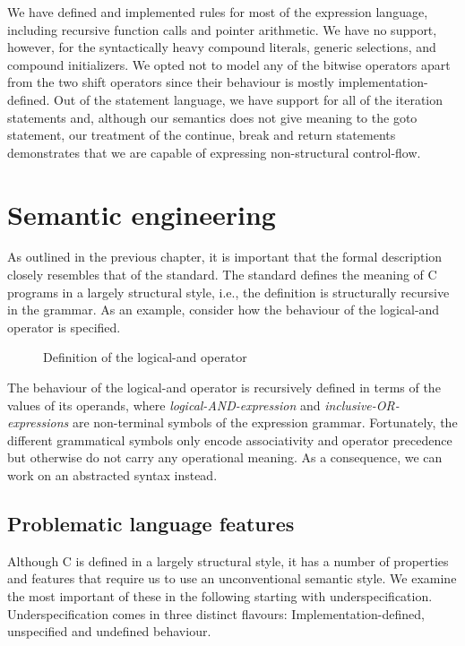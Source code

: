\documentclass[a4paper,12pt]{scrbook}
\theoremstyle{plain}
\theoremstyle{definition}
\begin{document}
We have defined and implemented rules for most of the expression language,
including recursive function calls and pointer arithmetic. We have no support,
however, for the syntactically heavy compound literals, generic selections, and
compound initializers. We opted not to model any of the bitwise operators apart
from the two shift operators since their behaviour is mostly
implementation-defined. Out of the statement language, we have support for all
of the iteration statements and, although our semantics does not give meaning to
the goto statement, our treatment of the continue, break and return statements
demonstrates that we are capable of expressing non-structural control-flow.

\section{Semantic engineering}
As outlined in the previous chapter, it is important that the formal description
closely resembles that of the standard. The standard defines the meaning of C
programs in a largely structural style, i.e., the definition is structurally
recursive in the grammar. As an example, consider how the behaviour of the
logical-and operator is specified.

\begin{figure}[htb]
\centering
\fbox{
\texttt{[image: n1539]}
}
\caption{Definition of the logical-and operator \cite[p. 99]{c1x}}
\label{land}
\end{figure}
The behaviour of the logical-and operator is recursively defined in terms of the
values of its operands, where \textit{logical-AND-expression} and
\textit{inclusive-OR-expressions} are non-terminal symbols of the expression
grammar. Fortunately, the different grammatical symbols only encode
associativity and operator precedence but otherwise do not carry any operational
meaning. As a consequence, we can work on an abstracted syntax instead.

\subsection{Problematic language features}\label{problematic}
Although C is defined in a largely structural style, it has a number of
properties and features that require us to use an unconventional semantic
style. We examine the most important of these in the following starting with
underspecification. Underspecification comes in three distinct flavours:
Implementation-defined, unspecified and undefined behaviour.
\end{document}
